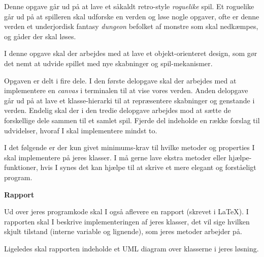 
Denne opgave går ud på at lave et såkaldt retro-style \emph{roguelike}
spil. Et roguelike går ud på at spilleren skal udforske en verden og løse
nogle opgaver, ofte er denne verden et underjordisk fantasy
\emph{dungeon} befolket af monstre som skal nedkæmpes, og gåder der
skal løses.

I denne opgave skal der arbejdes med at lave et objekt-orienteret
design, som gør det nemt at udvide spillet med nye skabninger og
spil-mekanismer.

Opgaven er delt i fire dele. I den første delopgave skal der arbejdes
med at implementere en \emph{canvas} i terminalen til at vise vores
verden. Anden delopgave går ud på at lave et klasse-hierarki til at
repræsentere skabninger og genstande i verden. Endelig skal der i den
tredie delopgave arbejdes mod at sætte de forskellige dele sammen til
et samlet spil. Fjerde del indeholde en række forslag til udvidelser,
hvoraf I skal implementere mindst to.

I det følgende er der kun givet minimums-krav til hvilke metoder og
properties I skal implementere på jeres klasser. I må gerne lave
ekstra metoder eller hjælpe-funktioner, hvis I synes det kan hjælpe
til at skrive et mere elegant og forståeligt program.

\textbf{Rapport}

Ud over jeres programkode skal I også aflevere en rapport (skrevet i
\LaTeX). I rapporten skal I beskrive implementeringen af jeres
klasser, det vil sige hvilken skjult tilstand (interne variable og
lignende), som jeres metoder arbejder på.

Ligeledes skal rapporten indeholde et UML diagram over klasserne i
jeres løsning.


